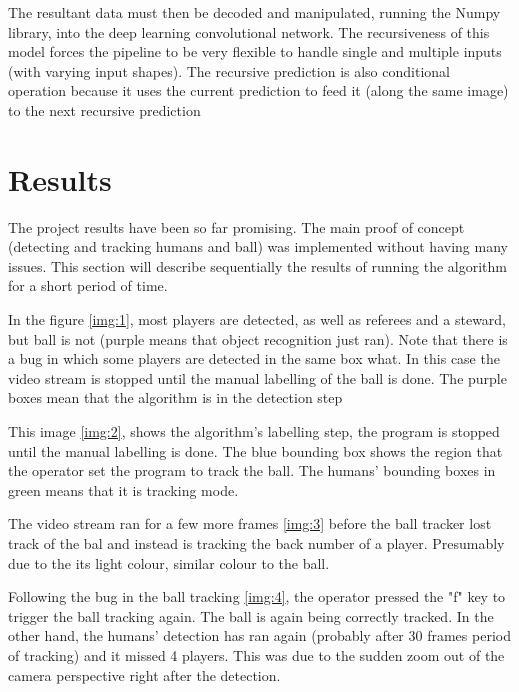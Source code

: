 \documentclass[
    11pt,
    twoside
]{report}
\begin{document}
The resultant data must then be decoded and manipulated, running the Numpy library, into the deep learning convolutional network. The recursiveness of this model forces the pipeline to be very flexible to handle single and multiple inputs (with varying input shapes). The recursive prediction is also conditional operation because it uses the current prediction to feed it (along the same image) to the next recursive prediction



\section{Results}

The project results have been so far promising. The main proof of concept (detecting and tracking humans and ball) was implemented without having many issues. This section will describe sequentially the results of running the algorithm for a short period of time.



In the figure \ref{img:1}, most players are detected, as well as referees and a steward, but ball is not (purple means that object recognition just ran). Note that there is a bug in which some players are detected in the same box what. In this case the video stream is stopped until the manual labelling of the ball is done. The purple boxes mean that the algorithm is in the detection step



This image \ref{img:2}, shows the algorithm's labelling step, the program is stopped until the manual labelling is done. The blue bounding box shows the region that the operator set the program to track the ball. The humans' bounding boxes in green means that it is tracking mode.



The video stream ran for a few more frames \ref{img:3} before the ball tracker lost track of the bal and instead is tracking the back number of a player. Presumably due to the its light colour, similar colour to the ball.



Following the bug in the ball tracking \ref{img:4}, the operator pressed the "f" key to trigger the ball tracking again. The ball is again being correctly tracked. In the other hand, the humans' detection has ran again (probably after 30 frames period of tracking) and it missed 4 players. This was due to the sudden zoom out of the camera perspective right after the detection.
\end{document}
